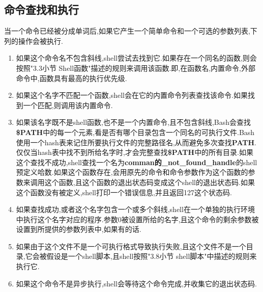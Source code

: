 \documentclass[draft,openany]{book}
\begin{document}
\begin{CJK}{UTF8}{gbsn}
    \subsection{命令查找和执行}
    当一个命令已经被分成单词后,如果它产生一个简单命令和一个可选的参数列表,下列的操作会被执行.
    \begin{enumerate}
        \item 如果这个命令名不包含斜线,shell尝试去找到它.如果存在一个同名的函数,则会按照"3.3小节 Shell函数"描述的规则来调用该函数.即,在函数名,内置命令,外部命令中,函数具有最高的执行优先级.
        \item 如果这个名字不匹配一个函数,shell会在它的内置命令列表查找该命令.如果找到一个匹配,则调用该内置命令.
        \item 如果该名字既不是shell函数,也不是一个内置命令,且不包含斜线,Bash会查找\textbf{\$PATH}中的每一个元素,看是否有哪个目录包含一个同名的可执行文件.Bash使用一个hash表来记住所要执行文件的完整路径名,从而避免多次查找\textbf{PATH}.仅仅当hash表中找不到所给名字时,才会完整查找\textbf{\$PATH}中的所有目录.如果这个查找不成功,shell查找一个名为\textbf{comman的\_not\_found\_handle}的shell预定义哈数.如果这个函数存在,会用原先的命令和命令参数作为这个函数的参数来调用这个函数,且这个函数的退出状态码变成这个shell的退出状态码.如果这个函数没有被定义,shell打印一个错误信息,并且返回127这个状态码.
        \item 如果查找成功,或者这个名字包含一个或多个斜线,shell在一个单独的执行环境中执行这个名字对应的程序.参数0被设置所给的名字,且这个命令的剩余参数被设置到所提供的参数列表中,如果有的话.
        \item 如果由于这个文件不是一个可执行格式导致执行失败,且这个文件不是一个目录,它会被假设是一个shell脚本,且shell按照"3.8小节 shell脚本"中描述的规则来执行它.
        \item 如果这个命令不是异步执行,shell会等待这个命令完成,并收集它的退出状态码.
    \end{enumerate}


\end{CJK}
\end{document}
